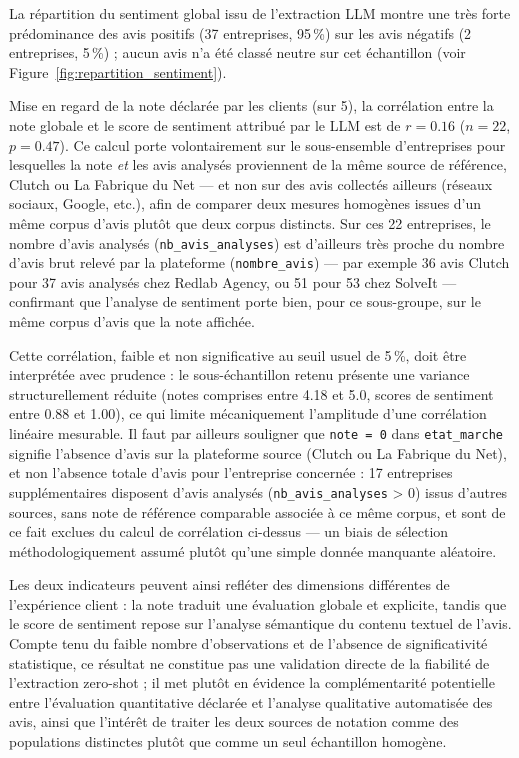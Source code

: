 La répartition du sentiment global issu de l'extraction LLM montre une très forte prédominance des avis
positifs (37 entreprises, 95\,\%) sur les avis négatifs (2 entreprises, 5\,\%) ; aucun avis n'a été classé
neutre sur cet échantillon (voir Figure~\ref{fig:repartition_sentiment}).

Mise en regard de la note déclarée par les clients (sur 5), la corrélation entre la note globale et le
score de sentiment attribué par le LLM est de $r = 0.16$ ($n = 22$, $p = 0.47$). Ce calcul porte
volontairement sur le sous-ensemble d'entreprises pour lesquelles la note \emph{et} les avis analysés
proviennent de la même source de référence, Clutch ou La Fabrique du Net --- et non sur des avis
collectés ailleurs (réseaux sociaux, Google, etc.), afin de comparer deux mesures homogènes issues d'un
même corpus d'avis plutôt que deux corpus distincts. Sur ces 22 entreprises, le nombre d'avis analysés
(\texttt{nb\_avis\_analyses}) est d'ailleurs très proche du nombre d'avis brut relevé par la plateforme
(\texttt{nombre\_avis}) --- par exemple 36 avis Clutch pour 37 avis analysés chez Redlab Agency, ou 51
pour 53 chez SolveIt --- confirmant que l'analyse de sentiment porte bien, pour ce sous-groupe, sur le
même corpus d'avis que la note affichée.

Cette corrélation, faible et non significative au seuil usuel de 5\,\%, doit être interprétée avec
prudence : le sous-échantillon retenu présente une variance structurellement réduite (notes comprises
entre 4.18 et 5.0, scores de sentiment entre 0.88 et 1.00), ce qui limite mécaniquement l'amplitude
d'une corrélation linéaire mesurable. Il faut par ailleurs souligner que \texttt{note = 0} dans
\texttt{etat\_marche} signifie l'absence d'avis sur la plateforme source (Clutch ou La Fabrique du Net),
et non l'absence totale d'avis pour l'entreprise concernée : 17 entreprises supplémentaires disposent
d'avis analysés (\texttt{nb\_avis\_analyses} > 0) issus d'autres sources, sans note de référence
comparable associée à ce même corpus, et sont de ce fait exclues du calcul de corrélation ci-dessus ---
un biais de sélection méthodologiquement assumé plutôt qu'une simple donnée manquante aléatoire.

Les deux indicateurs peuvent ainsi refléter des dimensions différentes de l'expérience client : la note
traduit une évaluation globale et explicite, tandis que le score de sentiment repose sur l'analyse
sémantique du contenu textuel de l'avis. Compte tenu du faible nombre d'observations et de l'absence de
significativité statistique, ce résultat ne constitue pas une validation directe de la fiabilité de
l'extraction zero-shot ; il met plutôt en évidence la complémentarité potentielle entre l'évaluation
quantitative déclarée et l'analyse qualitative automatisée des avis, ainsi que l'intérêt de traiter les
deux sources de notation comme des populations distinctes plutôt que comme un seul échantillon homogène.

